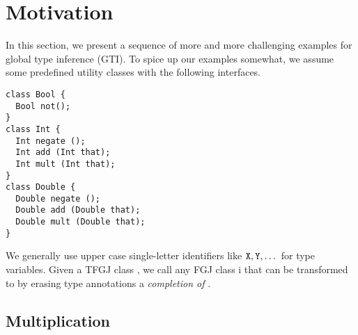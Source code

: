 \section{Motivation}
\label{sec:motivation}


In this section, we present a sequence of more and more challenging
examples for global type inference (GTI). To spice up our examples
somewhat, we assume some predefined utility classes with the following
interfaces.
\begin{lstlisting}
class Bool {
  Bool not(); 
}
class Int {
  Int negate ();
  Int add (Int that);
  Int mult (Int that);
}
class Double {
  Double negate ();
  Double add (Double that);
  Double mult (Double that);
}
\end{lstlisting}

We generally use upper case single-letter identifiers like ${\tt X},
{\tt Y}, \dots$ for type variables.
Given a TFGJ class , 
we call any FGJ class \CL i that can be transformed to  by
erasing type annotations a \emph{completion of  }.

\subsection{Multiplication}
\label{sec:multiplication}

